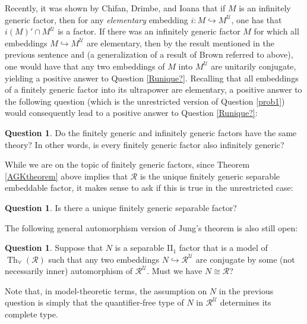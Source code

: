 \documentclass[12pt]{amsart}
\theoremstyle{definition}
\newtheorem{question}[thm]{Question}
\def\u{\mathsf 1}
\def \Th{\operatorname{Th}}
\def \R{\mathcal R}
\def \u{\mathcal U}
\begin{document}
Recently, it was shown by Chifan, Drimbe, and Ioana \cite[Theorem 6.4]{CDI} that if $M$ is an infinitely generic factor, then for any \emph{elementary} embedding $i:M\hookrightarrow M^\u$, one has that $i(M)'\cap M^\u$ is a factor.  If there was an infinitely generic factor $M$ for which all embeddings $M\hookrightarrow M^\u$ are elementary, then by the result mentioned in the previous sentence and \cite[Proposition 5.3]{atkinson} (a generalization of a result of Brown referred to above), one would have that any two embeddings of $M$ into $M^\u$ are unitarily conjugate, yielding a positive answer to Question \ref{Runique?}.  Recalling that all embeddings of a finitely generic factor into its ultrapower are elementary, a positive answer to the following question (which is the unrestricted version of Question \ref{prob1}) would consequently lead to a positive answer to Question \ref{Runique?}:

\begin{question}
Do the finitely generic and infinitely generic factors have the same theory?  In other words, is every finitely generic factor also infinitely generic?
\end{question}

While we are on the topic of finitely generic factors, since Theorem \ref{AGKtheorem} above implies that $\R$ is the unique finitely generic separable embeddable factor, it makes sense to ask if this is true in the unrestricted case:

\begin{question}
Is there a unique finitely generic separable factor?
\end{question}

The following general automorphism version of Jung's theorem is also still open:

\begin{question}
Suppose that $N$ is a separable II$_1$ factor that is a model of $\Th_\forall(\R)$ such that any two embeddings $N\hookrightarrow \R^\u$ are conjugate by some (not necessarily inner) automorphism of $\R^\u$.  Must we have $N\cong \R$?
\end{question}

Note that, in model-theoretic terms, the assumption on $N$ in the previous question is simply that the quantifier-free type of $N$ in $\R^\u$ determines its complete type.
\end{document}
